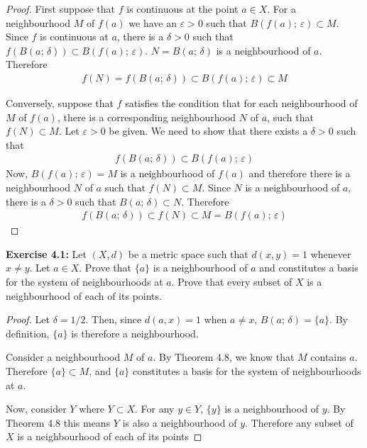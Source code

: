 \documentclass{article}
\begin{document}
\begin{proof}
    First suppose that $f$ is continuous at the point $a \in X$. For a neighbourhood $M$ of $f(a)$ we have an $\varepsilon > 0$ such
    that $B(f(a);\,\varepsilon) \subset M$. Since $f$ is continuous at $a$, there is a $\delta > 0$ such that $f(B(a;\,\delta)) \subset B(f(a);\,\varepsilon)$.
    $N = B(a;\,\delta)$ is a neighbourhood of $a$. Therefore
    \begin{align*}
        f(N) = f(B(a;\,\delta)) \subset B(f(a);\,\varepsilon) \subset M
    \end{align*}
    
    Conversely, suppose that $f$ satisfies the condition that for each neighbourhood of $M$ of $f(a)$, there is a corresponding neighbourhood
    $N$ of $a$, such that $f(N) \subset M$. Let $\varepsilon > 0$ be given. We need to show that there exists a $\delta > 0$ such that
    \begin{align*}
        f(B(a;\,\delta)) \subset B(f(a);\,\varepsilon)
    \end{align*}
    Now, $B(f(a);\,\varepsilon) = M$ is a neighbourhood of $f(a)$ and therefore there is a neighbourhood $N$ of $a$ such that $f(N) \subset M$.
    Since $N$ is a neighbourhood of $a$, there is a $\delta > 0$ such that $B(a;\,\delta) \subset N$. Therefore
    \begin{align*}
        f(B(a;\,\delta)) \subset f(N) \subset M = B(f(a);\,\varepsilon  )
    \end{align*}
\end{proof}
\pagebreak

\textbf{Exercise 4.1:} Let $(X, d)$ be a metric space such that $d(x, y) = 1$ whenever $x \ne y$. Let $a \in X$. Prove that $\{a\}$ is a
neighbourhood of $a$ and constitutes a basis for the system of neighbourhoods at $a$. Prove that every subset of $X$ is a neighbourhood
of each of its points.

\begin{proof}
    Let $\delta = 1/2$. Then, since $d(a, x) = 1$ when $a \ne x$, $B(a;\,\delta) = \{a\}$. By definition,
    $\{a\}$ is therefore a neighbourhood.

    Consider a neighbourhood $M$ of $a$. By Theorem 4.8, we know that $M$ contains $a$. Therefore $\{a\} \subset M$, and 
    $\{a\}$ constitutes a basis for the system of neighbourhoods at $a$.

    Now, consider $Y$ where $Y \subset X$. For any $y \in Y$, $\{y\}$ is a neighbourhood of $y$. By Theorem 4.8 this means $Y$
    is also a neighbourhood of $y$. Therefore any subset of $X$ is a neighbourhood of each of its points
\end{proof}
\end{document}
